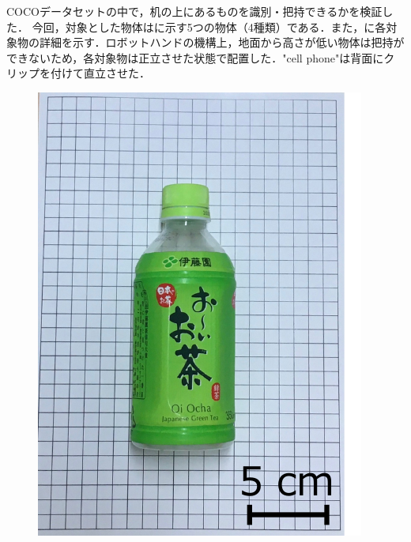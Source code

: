 COCOデータセットの中で，机の上にあるものを識別・把持できるかを検証した．
今回，対象とした物体はに示す5つの物体（4種類）である．また，に各対象物の詳細を示す．ロボットハンドの機構上，地面から高さが低い物体は把持ができないため，各対象物は正立させた状態で配置した．"cell phone"は背面にクリップを付けて直立させた．
\begin{figure}[H]
    \centering
    
    \begin{minipage}{0.19\columnwidth}
        \centering
        \includegraphics[clip, width=\linewidth]{figure/chapter4/bottle_350ml}
    \end{minipage}
    \begin{minipage}{0.19\columnwidth}
        \centering

\end{minipage}
\end{figure}
